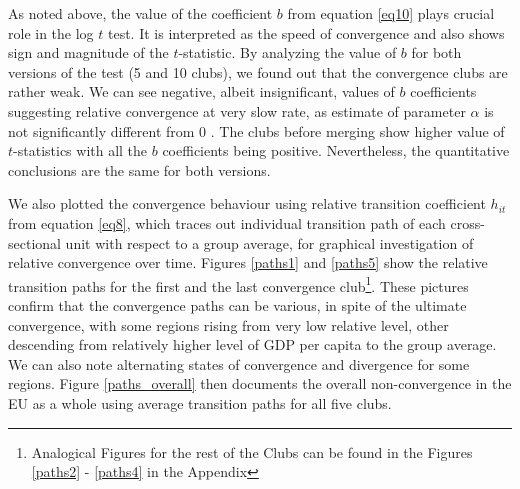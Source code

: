 \documentclass[11pt]{article}
\begin{document}
\begin{table}[!htbp] \centering 
 \caption{Convergence club classification after merging} 
  \label{Table_clubs1} 
\end{table}


As noted above, the value of the coefficient $b$ from equation \ref{eq10} plays crucial role in the log $t$ test. It is interpreted as the speed of convergence and also shows sign and magnitude of the $t$-statistic. By analyzing the value of $b$ for both versions of the test (5 and 10 clubs), we found out that the convergence clubs are rather weak. We can see negative, albeit insignificant, values of $b$ coefficients suggesting relative convergence at very slow rate, as estimate of parameter $\alpha$ is not significantly different from 0 \citep{phillips2007transition}. The clubs before merging show higher value of $t$-statistics with all the $b$ coefficients being positive. Nevertheless, the quantitative conclusions are the same for both versions.

We also plotted the convergence behaviour using relative transition coefficient $h_{it}$ from equation \ref{eq8}, which traces out individual transition path of each cross-sectional unit with respect to a group average, for graphical investigation of relative convergence over time. Figures \ref{paths1} and \ref{paths5} show the relative transition paths for the first and the last convergence club\footnote{Analogical Figures for the rest of the Clubs can be found in the Figures \ref{paths2} - \ref{paths4} in the Appendix}. These pictures confirm that the convergence paths can be various, in spite of the ultimate convergence, with some regions rising from very low relative level, other descending from relatively higher level of GDP per capita to the group average. We can also note alternating states of convergence and divergence for some regions. Figure \ref{paths_overall} then documents the overall non-convergence in the EU as a whole using average transition paths for all five clubs.
\end{document}
